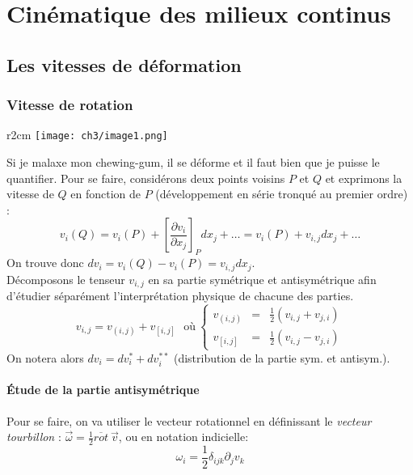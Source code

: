 \chapter{Cinématique des milieux continus}
\section{Les vitesses de déformation}

    \subsection{Vitesse de rotation}
    \begin{wrapfigure}[6]{r}{2cm}
    \texttt{[image: ch3/image1.png]}
    \end{wrapfigure}
    Si je malaxe mon chewing-gum, il se déforme et il faut bien que je puisse le quantifier.
    Pour se faire, considérons deux points voisins $P$ et $Q$ et exprimons la vitesse de $Q$
    en fonction de $P$ (développement en série tronqué au premier ordre) : 
    \begin{equation}
    v_i(Q) = v_i(P) + \left[
    \dfrac{\partial v_i}{\partial x_j}\right]_P dx_j + \dots = v_i(P) + v_{i,j} dx_j + \dots
    \end{equation}
    On trouve donc $dv_i = v_i(Q) - v_i(P) = v_{i,j}dx_j$.\\
    
    Décomposons le tenseur $v_{i,j}$ en sa partie symétrique et antisymétrique afin d'étudier 
    séparément l'interprétation physique de chacune des parties.
    \begin{equation}
    v_{i,j} = v_{(i,j)} + v_{[i,j]}\ \ \ \text{où}\ \left\{\begin{array}{lll}
    v_{(i,j)} &=& \frac{1}{2}(v_{i,j}+v_{j,i})\\
    v_{[i,j]} &=& \frac{1}{2}(v_{i,j}-v_{j,i})
    \end{array}\right.
    \end{equation}
    On notera alors $dv_i = dv_i^* + dv_i^{**}$ (distribution de la partie sym. et antisym.).

        \subsubsection{Étude de la partie antisymétrique}
        Pour se faire, on va utiliser le vecteur rotationnel en définissant le \textit{vecteur
         tourbillon} : $\vec \omega = \frac{1}{2}\overline{rot}\ \vec{v}$, ou en notation indicielle:
         \begin{equation}
         \omega_i = \frac{1}{2}\delta_{ijk}\partial_jv_k
         \end{equation}
         
